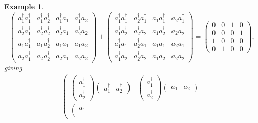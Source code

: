 \documentclass[aps, preprint]{revtex4}
\newtheorem{example}[theorem]{Example}
\begin{document}
\begin{example}
\begin{equation}\left (\begin{array}{cccc}a_{1}^{ \dag } a_{1}^{ \dag } & a_{1}^{ \dag } a_{2}^{ \dag } & a_{1}^{ \dag } a_{1} & a_{1}^{ \dag } a_{2} \\
a_{2}^{ \dag } a_{1}^{ \dag } & a_{2}^{ \dag } a_{2}^{ \dag } & a_{2}^{ \dag } a_{1} & a_{2}^{ \dag } a_{2} \\
a_{1} a_{1}^{ \dag } & a_{1} a_{2}^{ \dag } & a_{1} a_{1} & a_{1} a_{2} \\
a_{2} a_{1}^{ \dag } & a_{2} a_{2}^{ \dag } & a_{2} a_{1} & a_{2} a_{2}\end{array}\right ) +\left (\begin{array}{cccc}a_{1}^{ \dag } a_{1}^{ \dag } & a_{2}^{ \dag } a_{1}^{ \dag } & a_{1} a_{1}^{ \dag } & a_{2} a_{1}^{ \dag } \\
a_{1}^{ \dag } a_{2}^{ \dag } & a_{2}^{ \dag } a_{2}^{ \dag } & a_{1} a_{2}^{ \dag } & a_{2} a_{2}^{ \dag } \\
a_{1}^{ \dag } a_{1} & a_{2}^{ \dag } a_{1} & a_{1} a_{1} & a_{2} a_{1} \\
a_{1}^{ \dag } a_{2} & a_{2}^{ \dag } a_{2} & a_{1} a_{2} & a_{2} a_{2}\end{array}\right ) =\left (\begin{array}{cccc}0 & 0 & 1 & 0 \\
0 & 0 & 0 & 1 \\
1 & 0 & 0 & 0 \\
0 & 1 & 0 & 0\end{array}\right )\text{,}
\end{equation}giving
\begin{gather}\left (\begin{array}{cc}\left (\begin{array}{c}a_{1}^{ \dag } \\
a_{2}^{ \dag }\end{array}\right ) \left (\begin{array}{cc}a_{1}^{ \dag } & a_{2}^{ \dag }\end{array}\right ) & \left (\begin{array}{c}a_{1}^{ \dag } \\
a_{2}^{ \dag }\end{array}\right ) \left (\begin{array}{cc}a_{1} & a_{2}\end{array}\right ) \\
\left (\begin{array}{c}a_{1} \\

\end{array}
\end{array}
\end{gather}
\end{example}
\end{document}
